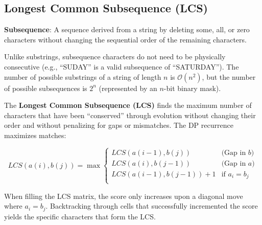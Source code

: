 \subsection{Longest Common Subsequence (LCS)}

\begin{important}
    \textbf{Subsequence}: A sequence derived from a string by deleting some, all, or zero characters without changing the sequential order of the remaining characters.
\end{important}

Unlike substrings, subsequence characters do not need to be physically consecutive (e.g., ``SUDAY'' is a valid subsequence of ``SATURDAY''). The number of possible substrings of a string of length \(n\) is \(\mathcal{O}(n^2)\), but the number of possible subsequences is \(2^n\) (represented by an $n$-bit binary mask).

The \textbf{Longest Common Subsequence (LCS)} finds the maximum number of characters that have been ``conserved'' through evolution without changing their order and without penalizing for gaps or mismatches. The DP recurrence maximizes matches:

\begin{equation}
LCS(a(i), b(j)) = \max 
\begin{cases} 
LCS(a(i-1), b(j)) & \text{(Gap in } b \text{)} \\
LCS(a(i), b(j-1)) & \text{(Gap in } a \text{)} \\
LCS(a(i-1), b(j-1)) + 1 & \text{if } a_i = b_j \\
\end{cases}
\end{equation}

When filling the LCS matrix, the score only increases upon a diagonal move where \(a_i = b_j\). Backtracking through cells that successfully incremented the score yields the specific characters that form the LCS.



